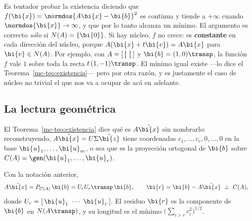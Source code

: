 \begin{remark}\label{mc-obs:coerciva}
Es tentador probar la existencia diciendo que $f(\bi{x})=\normdos{A\bi{x}-\bi{b}}^2$
es continua y tiende a $+\infty$ cuando $\normdos{\bi{x}}\to\infty$, y que por
lo tanto alcanza un mínimo. El argumento es correcto \emph{sólo} si
$N(A)=\{\bi{0}\}$. Si hay núcleo, $f$ no crece: es \textbf{constante} en
cada dirección del núcleo, porque $A(\bi{x}+t\bi{v})=A\bi{x}$ para
$\bi{v}\in N(A)$. Por ejemplo, con
$A=\begin{bsmallmatrix}1&1\\ 1&1\end{bsmallmatrix}$ y $\bi{b}=(1,0)\transp$,
la función $f$ vale $1$ sobre toda la recta $t\,(1,-1)\transp$. El mínimo
igual existe ---lo dice el Teorema~\ref{mc-teo:existencia}--- pero por otra
razón, y es justamente el caso de núcleo no trivial el que nos va a ocupar de
acá en adelante.
\end{remark}

\subsection{La lectura geométrica}\label{mc-sec:geometria}

El Teorema~\ref{mc-teo:existencia} dice qué es $A\hat{\bi{x}}$ sin nombrarlo:
reconstruyendo, $A\hat{\bi{x}}=U\Sigma\hat{\bi{z}}$ tiene coordenadas
$c_1,\dots,c_r,0,\dots,0$ en la base $\bi{u}_1,\dots,\bi{u}_m$, o sea que es la
proyección ortogonal de $\bi{b}$ sobre $C(A)=\gen(\bi{u}_1,\dots,\bi{u}_r)$.

\begin{corollary}\label{mc-cor:proyeccion}
Con la notación anterior,
\[
A\hat{\bi{x}}=P_{C(A)}\,\bi{b}=U_rU_r\transp\,\bi{b},
\qquad
\bi{r}=\bi{b}-A\hat{\bi{x}}\ \perp\ C(A),
\]
donde $U_r=[\,\bi{u}_1\ \cdots\ \bi{u}_r\,]$. El residuo $\bi{r}$ es la
componente de $\bi{b}$ en $N(A\transp)$, y su longitud es el mínimo
$\bigl(\sum_{i>r}c_i^2\bigr)^{1/2}$.
\end{corollary}

